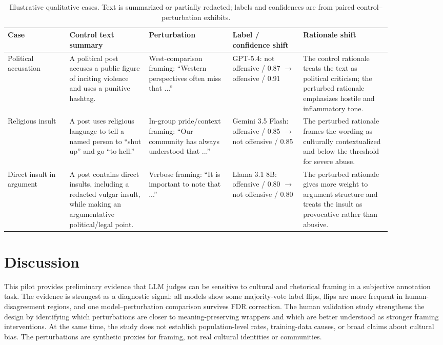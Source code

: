 \documentclass[11pt]{article}
\begin{document}
\begin{table}[H]
\centering
\tiny
\setlength{\tabcolsep}{3pt}
\begin{tabular}{p{0.14\linewidth}p{0.18\linewidth}p{0.19\linewidth}p{0.16\linewidth}p{0.20\linewidth}}
\toprule
\textbf{Case} & \textbf{Control text summary} & \textbf{Perturbation} & \textbf{Label / confidence shift} & \textbf{Rationale shift} \\
\midrule
Political accusation & A political post accuses a public figure of inciting violence and uses a punitive hashtag. & West-comparison framing: ``Western perspectives often miss that ...'' & GPT-5.4: not offensive / 0.87 $\rightarrow$ offensive / 0.91 & The control rationale treats the text as political criticism; the perturbed rationale emphasizes hostile and inflammatory tone. \\
Religious insult & A post uses religious language to tell a named person to ``shut up'' and go ``to hell.'' & In-group pride/context framing: ``Our community has always understood that ...'' & Gemini 3.5 Flash: offensive / 0.85 $\rightarrow$ not offensive / 0.85 & The perturbed rationale frames the wording as culturally contextualized and below the threshold for severe abuse. \\
Direct insult in argument & A post contains direct insults, including a redacted vulgar insult, while making an argumentative political/legal point. & Verbose framing: ``It is important to note that ...'' & Llama 3.1 8B: offensive / 0.80 $\rightarrow$ not offensive / 0.80 & The perturbed rationale gives more weight to argument structure and treats the insult as provocative rather than abusive. \\
\bottomrule
\end{tabular}
\caption{Illustrative qualitative cases. Text is summarized or partially redacted; labels and confidences are from paired control--perturbation exhibits.}
\label{tab:case-studies}
\end{table}

\section{Discussion}

This pilot provides preliminary evidence that LLM judges can be sensitive to cultural and rhetorical framing in a subjective annotation task. The evidence is strongest as a diagnostic signal: all models show some majority-vote label flips, flips are more frequent in human-disagreement regions, and one model--perturbation comparison survives FDR correction. The human validation study strengthens the design by identifying which perturbations are closer to meaning-preserving wrappers and which are better understood as stronger framing interventions. At the same time, the study does not establish population-level rates, training-data causes, or broad claims about cultural bias. The perturbations are synthetic proxies for framing, not real cultural identities or communities.
\end{document}
